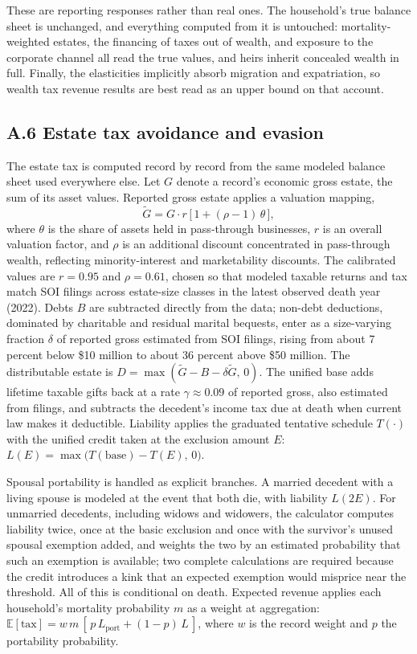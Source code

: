 \documentclass[10pt,twocolumn]{article}
\begin{document}
These are reporting responses rather than real ones. The household's true balance
sheet is unchanged, and everything computed from it is untouched:
mortality-weighted estates, the financing of taxes out of wealth, and exposure
to the corporate channel all read the true values, and heirs inherit concealed
wealth in full. Finally, the elasticities implicitly absorb migration and
expatriation, so wealth tax revenue results are best read as an upper bound on
that account.

\subsection*{A.6 Estate tax avoidance and evasion}

The estate tax is computed record by record from the same modeled balance
sheet used everywhere else. Let $G$ denote a record's economic gross estate,
the sum of its asset values. Reported gross estate applies a valuation
mapping,
\begin{equation*}
\tilde{G} = G \cdot r \, \bigl[\, 1 + (\rho - 1)\, \theta \,\bigr],
\end{equation*}
where $\theta$ is the share of assets held in pass-through businesses, $r$ is
an overall valuation factor, and $\rho$ is an additional discount concentrated
in pass-through wealth, reflecting minority-interest and marketability
discounts. The calibrated values are $r = 0.95$ and $\rho = 0.61$, chosen so
that modeled taxable returns and tax match SOI filings across estate-size
classes in the latest observed death year (2022). Debts $B$ are subtracted
directly from the data; non-debt deductions, dominated by charitable and
residual marital bequests, enter as a size-varying fraction $\delta$ of
reported gross estimated from SOI filings, rising from about 7 percent below
\$10 million to about 36 percent above \$50 million. The distributable estate
is $D = \max(\tilde{G} - B - \delta \tilde{G},\, 0)$. The unified base adds
lifetime taxable gifts back at a rate $\gamma \approx 0.09$ of reported gross,
also estimated from filings, and subtracts the decedent's income tax due at
death when current law makes it deductible. Liability applies the graduated
tentative schedule $T(\cdot)$ with the unified credit taken at the exclusion
amount $E$: $L(E) = \max\bigl(T(\text{base}) - T(E),\, 0\bigr)$.

Spousal portability is handled as explicit branches. A married decedent with a
living spouse is modeled at the event that both die, with liability $L(2E)$.
For unmarried decedents, including widows and widowers, the calculator
computes liability twice, once at the basic exclusion and once with the
survivor's unused spousal exemption added, and weights the two by an estimated
probability that such an exemption is available; two complete calculations are
required because the credit introduces a kink that an expected exemption would
misprice near the threshold. All of this is conditional on death. Expected
revenue applies each household's mortality probability $m$ as a weight at
aggregation: $\mathbb{E}[\text{tax}] = w\, m \,[\, p\, L_{\text{port}} +
(1-p)\, L \,]$, where $w$ is the record weight and $p$ the portability
probability.
\end{document}
